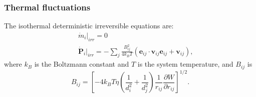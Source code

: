 \begin{frame}
  \frametitle{Thermal fluctuations}
The isothermal deterministic irreversible equations are:
\begin{eqnarray}\label{equ:thermalfur}
  & &\dot{m}_i\vert_{irr}=0  \nonumber \\
& &\dot{\mathbf{P}}_i\vert_{irr}=-\sum_j\frac{B_{ij}^2}{4k_BT}
(\mathbf{e}_{ij}\cdot\mathbf{v}_{ij}\mathbf{e}_{ij}+\mathbf{v}_{ij}),
\end{eqnarray}
where $k_B$ is the Boltzmann constant and $T$ is the system temperature, and $B_{ij}$ is
\begin{equation}\label{equ:b}
 B_{ij}=[-4k_BT\eta\left(\frac{1}{d_{i}^{2}}+\frac{1}{d_{j}^{2}}\right)\frac{1}{r_{ij}}\frac{\partial W}{\partial r_{ij}}]^{1/2}.
\end{equation}
\end{frame}

